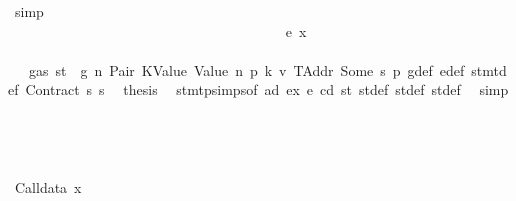 \begin{isabellebody}
\ simp\isanewline
\ \ \ \ \ \ \ \ \ \ \ \ \ \ \ \ \ \ \ \ \ \ \ \ \ \ \ \ \ \ \ \ \ \ \ \ \isamarkupfalse%
\isanewline
\ \ \ \ \ \ \ \ \ \ \ \ \ \ \ \ \ \ \ \ \ \ \ \ \ \ \ \ \ \ \ \ \ \ \ \ \ \ \isamarkupfalse%
\ {\isacharparenleft}{\kern0pt}e\ x{\isacharparenright}{\kern0pt}\isanewline
\ \ \ \ \ \ \ \ \ \ \ \ \ \ \ \ \ \ \ \ \ \ \ \ \ \ \ \ \ \ \ \ \ \ \ \ \ \ \isamarkupfalse%
\ {}{\isacharparenleft}{\kern0pt}{}{\isacharparenright}{\kern0pt}\ {\isacharbackquoteopen}{\isasymnot}\ gas\ st\ {\isasymle}\ g{\isacharbackquoteclose}\ n\ Pair\ KValue\ Value\ n{}\ p{}\ k{}\ v{}\ TAddr\ Some\ s{}\ p{}\ g{\isacharunderscore}{\kern0pt}def\ e{\isacharprime}{\kern0pt}{\isacharunderscore}{\kern0pt}def\ stmt{\isacharunderscore}{\kern0pt}def\ Contract\ s{}\ s{}\ \isamarkupfalse%
\ {\isacharquery}{\kern0pt}thesis\ \isamarkupfalse%
\ stmt{\isachardot}{\kern0pt}psimps{\isacharparenleft}{\kern0pt}{}{\isacharparenright}{\kern0pt}{\isacharbrackleft}{\kern0pt}of\ ad\ ex\ e\ cd\ st{\isacharbrackright}{\kern0pt}\ st{\isacharprime}{\kern0pt}{\isacharunderscore}{\kern0pt}def\ st{\isacharprime}{\kern0pt}{\isacharprime}{\kern0pt}{\isacharunderscore}{\kern0pt}def\ st{\isacharprime}{\kern0pt}{\isacharprime}{\kern0pt}{\isacharprime}{\kern0pt}{\isacharunderscore}{\kern0pt}def\ \isamarkupfalse%
\ simp\isanewline
\ \ \ \ \ \ \ \ \ \ \ \ \ \ \ \ \ \ \ \ \ \ \ \ \ \ \ \ \ \ \ \ \ \ \ \ \isamarkupfalse%
\isanewline
\ \ \ \ \ \ \ \ \ \ \ \ \ \ \ \ \ \ \ \ \ \ \ \ \ \ \ \ \ \ \ \ \ \ \isamarkupfalse%
\isanewline
\ \ \ \ \ \ \ \ \ \ \ \ \ \ \ \ \ \ \ \ \ \ \ \ \ \ \ \ \ \ \ \ \isamarkupfalse%
\isanewline
\ \ \ \ \ \ \ \ \ \ \ \ \ \ \ \ \ \ \ \ \ \ \ \ \ \ \ \ \ \ \isamarkupfalse%
\isanewline
\ \ \ \ \ \ \ \ \ \ \ \ \ \ \ \ \ \ \ \ \ \ \ \ \ \ \ \ \isamarkupfalse%
\isanewline
\ \ \ \ \ \ \ \ \ \ \ \ \ \ \ \ \ \ \ \ \ \ \ \ \ \ \isamarkupfalse%
\isanewline
\ \ \ \ \ \ \ \ \ \ \ \ \ \ \ \ \ \ \ \ \ \ \ \ \isamarkupfalse%
\isanewline
\ \ \ \ \ \ \ \ \ \ \ \ \ \ \ \ \ \ \ \ \ \ \isamarkupfalse%
\isanewline
\ \ \ \ \ \ \ \ \ \ \ \ \ \ \ \ \ \ \ \ \ \ \ \ \isamarkupfalse%
\ {\isacharparenleft}{\kern0pt}Calldata\ x{}{\isacharparenright}{\kern0pt}\isanewline
\ \ \ \ \ \ \ \ \ \ \ \ \ \ \ \ \ \ \ \ \ \ \ \ \isamarkupfalse%

\end{isabellebody}

